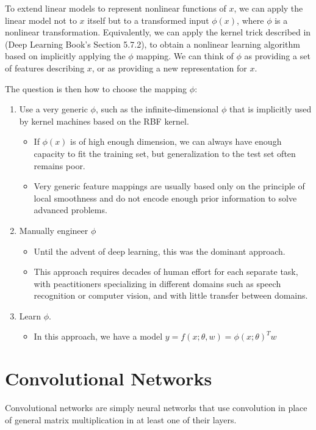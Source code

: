 \documentclass{report}
\begin{document}
\noindent To extend linear models to represent nonlinear functions of $x$, we can apply the linear model not to $x$ itself but to a transformed input $\phi(x)$, where $\phi$ is a nonlinear transformation. Equivalently, we can apply the kernel trick described in (Deep Learning Book's Section 5.7.2), to obtain a nonlinear learning algorithm based on implicitly applying the $\phi$ mapping. We can think of $\phi$ as providing a set of features describing $x$, or as providing a new representation for $x$.

\noindent The question is then how to choose the mapping $\phi$:
\begin{enumerate}
	\item Use a very generic $\phi$, such as the infinite-dimensional $\phi$ that is implicitly used by kernel machines based on the RBF kernel.\newline
    	\begin{itemize}
    		\item If $\phi(x)$ is of high enough dimension, we can always have enough capacity to fit the training set, but generalization to the test set often remains poor.
            \item Very generic feature mappings are usually based only on the principle of local smoothness and do not encode enough prior information to solve advanced problems.
    	\end{itemize}
    \item Manually engineer $\phi$\newline
    	\begin{itemize}
    		\item Until the advent of deep learning, this was the dominant approach.
            \item This approach requires decades of human effort for each separate task, with peactitioners specializing in different domains such as speech recognition or computer vision, and with little transfer between domains.
    	\end{itemize}
    \item Learn $\phi$.\newline
    	\begin{itemize}
    		\item In this approach, we have a model $y=f(x; \theta, w) = \phi(x; \theta)^Tw$
    	\end{itemize}
\end{enumerate}

\chapter{Convolutional Networks}
Convolutional networks are simply neural networks that use convolution in place of general matrix multiplication in at least one of their layers.
\end{document}
